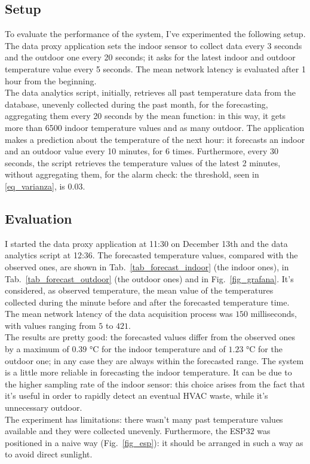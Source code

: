 \documentclass[conference]{IEEEtran}
\begin{document}
\subsection{Setup}
To evaluate the performance of the system, I've experimented the following setup.\\
The data proxy application sets the indoor sensor to collect data every 3 seconds and the outdoor one every 20 seconds; it asks for the latest indoor and outdoor temperature value every 5 seconds. The mean network latency is evaluated after 1 hour from the beginning.\\
The data analytics script, initially, retrieves all past temperature data from the database, unevenly collected during the past month, for the forecasting, aggregating them every 20 seconds by the mean function: in this way, it gets more than 6500 indoor temperature values and as many outdoor. The application makes a prediction about the temperature of the next hour: it forecasts an indoor and an outdoor value every 10 minutes, for 6 times. Furthermore, every 30 seconds, the script retrieves the temperature values of the latest 2 minutes, without aggregating them, for the alarm check: the threshold, seen in \eqref{eq_varianza}, is $0.03$.

\subsection{Evaluation}
I started the data proxy application at 11:30 on December 13th and the data analytics script at 12:36. The forecasted temperature values, compared with the observed ones, are shown in Tab.~\ref{tab_forecast_indoor} (the indoor ones), in Tab.~\ref{tab_forecast_outdoor} (the outdoor ones) and in Fig.~\ref{fig_grafana}. It's considered, as observed temperature, the mean value  of the temperatures collected during the minute before and after the forecasted temperature time. The mean network latency of the data acquisition process was $150$ milliseconds, with values ranging from $5$ to $421$.\\
The results are pretty good: the forecasted values differ from the observed ones by a maximum of $0.39$ °C for the indoor temperature and of $1.23$ °C for the outdoor one; in any case they are always within the forecasted range. The system is a little more reliable in forecasting the indoor temperature. It can be due to the higher sampling rate of the indoor sensor: this choice arises from the fact that it's useful in order to rapidly detect an eventual HVAC waste, while it's unnecessary outdoor.\\
The experiment has limitations: there wasn't many past temperature values available and they were collected unevenly. Furthermore, the ESP32 was positioned in a naive way (Fig.~\ref{fig_esp}): it should be arranged in such a way as to avoid direct sunlight.
\end{document}

